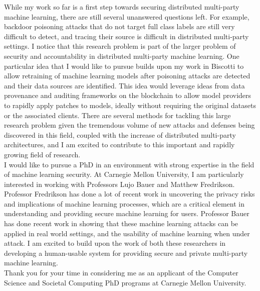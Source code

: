 \documentclass[10pt]{article} %
\begin{document}
While my work so far is a first step towards securing distributed multi-party machine learning, there are still several unanswered questions left. For example, backdoor poisoning attacks that do not target full class labels are still very difficult to detect, and tracing their source is difficult in distributed multi-party settings. I notice that this research problem is part of the larger problem of security and accountability in distributed multi-party machine learning. One particular idea that I would like to pursue builds upon my work in Biscotti to allow retraining of machine learning models after poisoning attacks are detected and their data sources are identified. This idea would leverage ideas from data provenance and auditing frameworks on the blockchain to allow model providers to rapidly apply patches to models, ideally without requiring the original datasets or the associated clients. There are several methods for tackling this large research problem given the tremendous volume of new attacks and defenses being discovered in this field, coupled with the increase of distributed multi-party architectures, and I am excited to contribute to this important and rapidly growing field of research. \\

I would like to pursue a PhD in an environment with strong expertise in the field of machine learning security. At Carnegie Mellon University, I am particularly interested in working with Professors Lujo Bauer and Matthew Fredrikson. Professor Fredrikson has done a lot of recent work in uncovering the privacy risks and implications of machine learning processes, which are a critical element in understanding and providing secure machine learning for users. Professor Bauer has done recent work in showing that these machine learning attacks can be applied in real world settings, and the usability of machine learning when under attack. I am excited to build upon the work of both these researchers in developing a human-usable system for providing secure and private multi-party machine learning. \\

Thank you for your time in considering me as an applicant of the Computer Science and Societal Computing PhD programs at Carnegie Mellon University.
\end{document}
